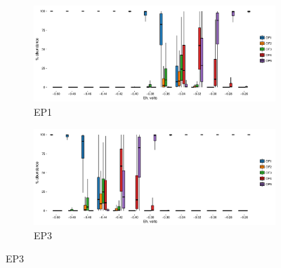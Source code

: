 \begin{figure}[h]
\centering

    \begin{subfigure}[b]{\linewidth}
      	\includegraphics[width=1\linewidth]{"figs_app2/boxplot_ggplot_02bin Empress OF1 iter 999"}
      	\caption{EP1}
        \label{fig:EP1_mc}
    \end{subfigure}
    \begin{subfigure}[b]{\linewidth}
    	\includegraphics[width=1\linewidth]{"figs_app2/boxplot_ggplot_02bin Empress OF3 iter 999"}
    	\caption{EP3}
        \label{fig:EP3_mc}
    \end{subfigure}
    
\end{figure}

\newpage

